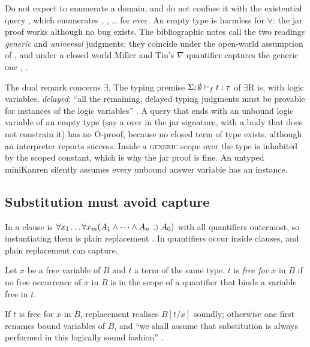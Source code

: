 {\begin{pitfall}
Do not expect  to enumerate a domain, and do not confuse it with the existential query
, which enumerates , , \dots{} for ever. An empty type is harmless
for $\forall$: the jar proof works although no bug exists. The bibliographic notes call the two readings
\emph{generic} and \emph{universal} judgments; they coincide under the open-world assumption of \fohh,
and under a closed world Miller and Tiu's $\nabla$ quantifier captures the generic one ,
\cite{MillerTiu2005}.

The dual remark concerns $\exists$. The typing premise $\Sigma;\emptyset\vdash_f t:\tau$ of $\exists$R is,
with logic variables, \emph{delayed}: ``all the remaining, delayed typing judgments must be provable for
instances of the logic variables'' . A query that ends with an unbound logic variable of an empty
type (say a  over  in the jar signature, with a body that does not constrain it) has no
O-proof, because no closed term of type  exists, although an interpreter reports success. Inside
a \textsc{generic} scope over  the type is inhabited by the scoped constant, which is why the jar
proof is fine. An untyped miniKanren silently assumes every unbound answer variable has an instance.
\end{pitfall}

\subsection{Substitution must avoid capture}

In \fohc{} a clause is $\forall x_1\dots\forall x_m(A_1\wedge\dots\wedge A_n\supset A_0)$ with all quantifiers
outermost, so instantiating them is plain replacement . In \fohh{} quantifiers occur inside
clauses, and plain replacement can capture.

\begin{definition}\label{def:hh-freefor}
Let $x$ be a free variable of $B$ and $t$ a term of the same type. $t$ is \emph{free for} $x$ in $B$ if no
free occurrence of $x$ in $B$ is in the scope of a quantifier that binds a variable free in $t$.
\end{definition}
If $t$ is free for $x$ in $B$, replacement realises $B[t/x]$ soundly; otherwise one first renames bound
variables of $B$, and ``we shall assume that substitution is always performed in this logically sound
fashion'' .

}

